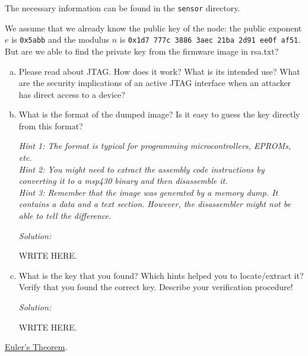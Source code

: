 \documentclass[a4paper,11pt]{article}
\newenvironment{solution}%
{\par{\noindent\small\textit{Solution:}}\vspace{-12pt}\begin{framed}}%
{\end{framed}\par}
\begin{document}
The necessary information can be found in the \texttt{sensor} directory.

We assume that we already know the public key of the node: the public exponent
$e$ is {\tt 0x5abb} and the modulus $n$ is {\tt 0x1d7 777c 3886 3aec 21ba 2d91
ee0f af51}. But are we able to find the private key from the firmware image in
rsa.txt?

\begin{enumerate}[(a)]

\item Please read about JTAG. How does it work? What is its intended use? What
are the security implications of an active JTAG interface when an attacker has
direct access to a device?

\item What is the format of the dumped image? Is it easy to guess the key
directly from this format?

\emph{Hint 1: The format is typical for programming microcontrollers, EPROMs,
etc.}
\\
\emph{Hint 2: You might need to extract the assembly code instructions by converting
it to a msp430 binary and then disassemble it.}
\\
\emph{Hint 3: Remember that the image was generated by a memory dump. It
contains a data and a text section. However, the disassembler might not be able
to tell the difference.}

\ifsolution\begin{solution}
WRITE HERE.
\end{solution}\fi

\item What is the key that you found? Which hints helped you to
locate/extract it? Verify that you found the correct key. Describe your
verification procedure!
\ifsolution\begin{solution}
WRITE HERE.
\end{solution}\fi

\end{enumerate}

\begin{thebibliography}{1}
 \href{http://en.wikipedia.org/wiki/Euler's_theorem}{Euler's Theorem}.
\end{thebibliography}
\end{document}
